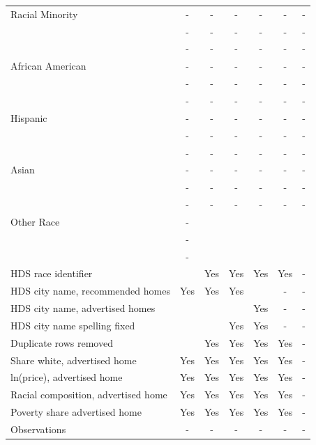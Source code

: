 \begin{table}[htbp]
{\begin{tabular}{l*{6}{c}}
\midrule
Racial Minority     &     -   &     -   &     -  &     -  &     -   & - \\
                    &   -   &    -   &   -   &    -   &    -   & - \\
                    & -   & -   & -   &-   & -   & - \\
\midrule
African American                   &     -   &     -   &     -  &     -  &     -   & - \\
                    &   -   &    -   &   -   &    -   &    -   & - \\
                    & -   & -   & -   &-   & -   & - \\
Hispanic                   &     -   &     -   &     -  &     -  &     -   & - \\
                    &   -   &    -   &   -   &    -   &    -   & - \\
                    & -   & -   & -   &-   & -   & - \\
Asian                   &     -   &     -   &     -  &     -  &     -   & - \\
                    &   -   &    -   &   -   &    -   &    -   & - \\
                    & -   & -   & -   &-   & -   & - \\
Other Race                   &     -   &        &       &       &        &  \\
                    &   -   &       &     &      &      &  \\
                    & -   &    &    &   &   &  \\
\midrule
HDS race identifier & & Yes & Yes & Yes & Yes & - \\
HDS city name, recommended homes & Yes & Yes & Yes & & - & -\\
HDS city name, advertised homes &  &  &  & Yes & - & -\\
HDS city name spelling fixed & & & Yes & Yes & - & -\\
Duplicate rows removed &  & Yes & Yes & Yes & Yes & - \\
\midrule
Share white, advertised home  & Yes & Yes & Yes & Yes & Yes & - \\
ln(price), advertised home  & Yes & Yes & Yes & Yes & Yes & - \\
Racial composition, advertised home & Yes & Yes & Yes & Yes & Yes & - \\
Poverty share advertised home & Yes & Yes & Yes & Yes & Yes & - \\
Observations        &        -   &        -   &        -   &        -   &        -   & - \\

\end{tabular}}
\end{table}
